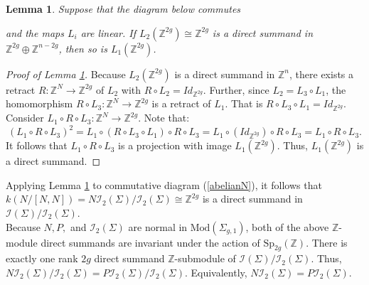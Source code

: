 \documentclass[a4paper]{amsproc}
\theoremstyle{TheoremNum}
\theoremstyle{Theorembold}
\newtheorem{lem}[thm]{Lemma}
\theoremstyle{TheoremboldDef}
\theoremstyle{TheoremboldRem}
\theoremstyle{TheoremboldRem}
\begin{document}
\begin{lem}\label{direct} 
Suppose that the diagram below commutes \begin{center}
  \end{center}
   and the maps $L_i$ are linear. 
 If $L_2({\mathbb{Z}}^{2g})\cong{\mathbb{Z}}^{2g}$ is a direct summand in ${\mathbb{Z}}^{2g}\oplus{\mathbb{Z}}^{n-2g}$, then so is $L_1({\mathbb{Z}}^{2g})$.
 \end{lem}
 
 \begin{proof}[Proof of Lemma \ref{direct}] Because $L_2({\mathbb{Z}}^{2g})$ is a direct summand in ${\mathbb{Z}}^n$, there exists a retract $R:{\mathbb{Z}}^{N}\to {\mathbb{Z}}^{2g}$ of $L_2$ with $R\circ L_2=Id_{{\mathbb{Z}}^{2g}}$. Further, since $L_2=L_3\circ L_1$, the homomorphism $R\circ L_3: {\mathbb{Z}}^{N}\to {\mathbb{Z}}^{2g}$ is a retract of $L_1$. That is $R\circ L_3\circ L_1=Id_{{\mathbb{Z}}^{2g}}$. Consider $L_1\circ R\circ L_3:{\mathbb{Z}}^{N}\to {\mathbb{Z}}^{2g}$. Note that: \[(L_1\circ R\circ L_3)^2=L_1\circ( R\circ L_3\circ L_1)\circ R\circ L_3=L_1\circ( Id_{{\mathbb{Z}}^{2g}})\circ R\circ L_3=L_1\circ R\circ L_3.\] It follows that $L_1\circ R\circ L_3$ is a projection with image $L_1({\mathbb{Z}}^{2g})$. Thus, $L_1({\mathbb{Z}}^{2g})$ is a direct summand.
 \end{proof}
 

 
Applying Lemma \ref{direct} to commutative diagram (\ref{abelianN}), it follows that $k(N/[N,N])=N{{\mathcal{I}}_2(\Sigma)}/{{\mathcal{I}}_2(\Sigma)}\cong{\mathbb{Z}}^{2g}$ is a direct summand in ${{\mathcal{I}}(\Sigma)}/{{\mathcal{I}}_2(\Sigma)}$.\\ 
 
 Because $N, P,$ and ${{\mathcal{I}}_2(\Sigma)}$ are normal in ${\text{Mod}(\Sigma_{g,1})}$, both of the above ${\mathbb{Z}}$-module direct summands are invariant under the action of ${\text{Sp}_{2g}({\mathbb{Z}})}$.
   There is exactly one rank $2g$ direct summand ${\mathbb{Z}}$-submodule of ${{\mathcal{I}}(\Sigma)}/{{\mathcal{I}}_2(\Sigma)}$. Thus, $N{{\mathcal{I}}_2(\Sigma)}/{{\mathcal{I}}_2(\Sigma)}= P{{\mathcal{I}}_2(\Sigma)}/{{\mathcal{I}}_2(\Sigma)}$. Equivalently, $N{{\mathcal{I}}_2(\Sigma)}=P{{\mathcal{I}}_2(\Sigma)}$.
\end{document}

